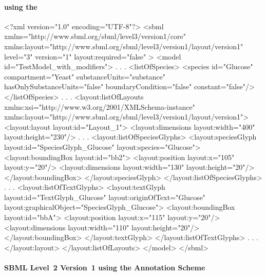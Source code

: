 \label{example:textglyph}
\paragraph{\sbmlthreecore using the \LayoutPackage}
\begin{example}
<?xml version="1.0" encoding="UTF-8"?>
<sbml xmlns="http://www.sbml.org/sbml/level3/version1/core" 
		xmlns:layout="http://www.sbml.org/sbml/level3/version1/layout/version1" 
		level="3" version="1" layout:required="false" >		
  <model id="TestModel_with_modifiers">
                .
                .
                .
    <listOfSpecies>
      <species id="Glucose" compartment="Yeast" substanceUnits="substance" 
			hasOnlySubstanceUnits="false" boundaryCondition="false" constant="false"/>
    </listOfSpecies>
                .
                .
                .
    <layout:listOfLayouts xmlns:xsi="http://www.w3.org/2001/XMLSchema-instance" 
		xmlns:layout="http://www.sbml.org/sbml/level3/version1/layout/version1">
      <layout:layout layout:id="Layout_1">
        <layout:dimensions layout:width="400" layout:height="230"/>
                .
                .
                .
        <layout:listOfSpeciesGlyphs>
          <layout:speciesGlyph layout:id="SpeciesGlyph_Glucose"  layout:species="Glucose">
            <layout:boundingBox layout:id="bb2">
              <layout:position layout:x="105" layout:y="20"/>
              <layout:dimensions layout:width="130" layout:height="20"/>
            </layout:boundingBox>
          </layout:speciesGlyph>
        </layout:listOfSpeciesGlyphs>					
                .
                .
                .
        <layout:listOfTextGlyphs>
          <layout:textGlyph layout:id="TextGlyph_Glucose" 
			layout:originOfText="Glucose" 
			layout:graphicalObject="SpeciesGlyph_Glucose">
            <layout:boundingBox layout:id="bbA">
              <layout:position layout:x="115" layout:y="20"/>
              <layout:dimensions layout:width="110" layout:height="20"/>
            </layout:boundingBox>
          </layout:textGlyph>
        </layout:listOfTextGlyphs>
                .
                .
                .
			</layout:layout>
		</layout:listOfLayouts>
  </model>
</sbml>
\end{example}
\paragraph{SBML Level~2 Version~1 using the Annotation Scheme}

